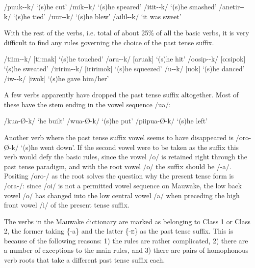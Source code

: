 \ea
\ea
/puuk--k/  `(s)he cut'
\ex
/mik--k/  `(s)he speared'
\ex
/itit--k/  `(s)he smashed'
\ex
/anetir--k/  `(s)he tied'
\ex
/{\textphi}uur--k/  `(s)he blew'
\ex
/a{\textphi}ilil--k/  `it was sweet'
\z
\z

With the rest of the verbs, i.e. total of about 25\% of all the basic verbs, it is very difficult to find any rules governing the choice of the past tense suffix.

\ea
\ea
/tiim--k/  [{{\textprimstress}tiːmak}]  `(s)he touched'
\ex
/aru{\textphi}--k/  [a{{\textprimstress}ru}{\textphi}ak]  `(s)he hit'
\ex
/oosip--k/  [{{\textprimstress}oːsipok}]  `(s)he sweated'
\ex
/{\textphi}iririm--k/  [{\textphi}i{{\textprimstress}ririmok}]  `(s)he squeezed'
\ex
/u{\textphi}--k/  [u{\textphi}{{\textprimstress}ok}]  `(s)he danced'
\ex
/iw--k/  [iw{{\textprimstress}ok}]   `(s)he gave him/her'
\z
\z

A few verbs apparently have dropped the past tense suffix altogether.  Most of these have the stem ending in the vowel sequence /ua/:

\ea
\ea
/kua-{\O-k}/  `he built'
\ex
/wua-{\O-k}/  `(s)he put'
\ex
/piipua-{\O-k}/  `(s)he left'
\z
\z

Another verb where the past tense suffix vowel seems to have disappeared is /oro-{\O}-k/ `(s)he went down'.  If the second vowel were to be taken as the suffix this verb would defy the basic rules, since the vowel /o/ is retained right through the past tense paradigm, and with the root vowel /o/ the suffix should be /-a/.  Positing /oro-/ as the root solves the question why the present tense form is /ora-/: since /oi/ is not a permitted vowel sequence on Mauwake, the low back vowel /o/ has changed into the low central vowel /a/ when preceding the high front vowel /i/ of the present tense suffix.

The verbs in the Mauwake dictionary are marked as belonging to Class 1 or Class 2, the former taking \{-a\} and the latter \{-\textsc{e}\} as the past tense suffix. This is because of the following reasons: 1) the rules are rather complicated, 2) there are a number of exceptions to the main rules, and 3) there are pairs of homophonous verb roots that take a different past tense suffix each.

